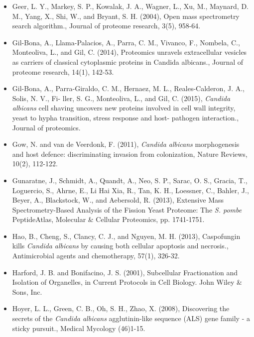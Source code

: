 \begin{itemize}
\item[]{%
Geer, L. Y., Markey, S. P., Kowalak, J. A., Wagner, L., Xu, M., Maynard, D. M., Yang, X., Shi, W.,
and Bryant, S. H. (2004), Open mass spectrometry search algorithm., Journal of proteome
research, 3(5), 958-64.
}

\item[]{%
Gil-Bona, A., Llama-Palacios, A., Parra, C. M., Vivanco, F., Nombela, C., Monteoliva, L., and
Gil, C. (2014), Proteomics unravels extracellular vesicles as carriers of classical cytoplasmic
proteins in Candida albicans., Journal of proteome research, 14(1), 142-53.
}

\item[]{%
Gil-Bona, A., Parra-Giraldo, C. M., Hernaez, M. L., Reales-Calderon, J. A., Solis, N. V., Fi-
ller, S. G., Monteoliva, L., and Gil, C. (2015), \textit{Candida albicans} cell shaving uncovers new
proteins involved in cell wall integrity, yeast to hypha transition, stress response and host-
pathogen interaction., Journal of proteomics.
}


\item[]{%
Gow, N. and van de Veerdonk, F. (2011), \textit{Candida albicans} morphogenesis and host defence:
discriminating invasion from colonization, Nature Reviews, 10(2), 112-122.
}

\item[]{%
Gunaratne, J., Schmidt, A., Quandt, A., Neo, S. P., Sarac, O. S., Gracia, T., Loguercio, S.,
Ahrne, E., Li Hai Xia, R., Tan, K. H., Loessner, C., Bahler, J., Beyer, A., Blackstock, W., and
Aebersold, R. (2013), Extensive Mass Spectrometry-Based Analysis of the Fission Yeast
Proteome: The \textit{S. pombe} PeptideAtlas, Molecular \& Cellular Proteomics, pp. 1741-1751.
}

\item[]{%
Hao, B., Cheng, S., Clancy, C. J., and Nguyen, M. H. (2013), Caspofungin kills 
\textit{Candida albicans} by causing both cellular apoptosis and necrosis.,
Antimicrobial agents and chemotherapy, 57(1), 326-32.
}

\item[]{%
Harford, J. B. and Bonifacino, J. S. (2001), 
Subcellular Fractionation and Isolation of Organelles,
in Current Protocols in Cell Biology. John Wiley \& Sons, Inc.
}

\item[]{
Hoyer, L. L., Green, C. B., Oh, S. H., Zhao, X.  (2008),
Discovering the secrets of the \textit{Candida albicans} agglutinin-like sequence (ALS) gene family - a sticky pursuit., 
Medical Mycology (46)1-15.
}


\end{itemize}
